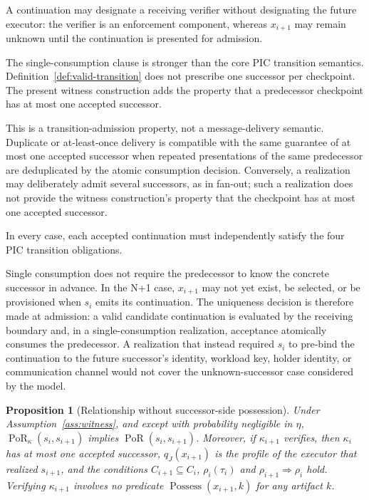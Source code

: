 \documentclass[10pt,twocolumn]{article}
\newcommand{\PoR}{\operatorname{PoR}}
\newtheorem{proposition}{Proposition}
\begin{document}
A continuation may designate a receiving verifier without designating the
future executor: the verifier is an enforcement component, whereas
\(x_{i+1}\) may remain unknown until the continuation is presented for
admission.

The single-consumption clause is stronger than the core PIC transition
semantics. Definition~\ref{def:valid-transition} does not prescribe one
successor per checkpoint. The present witness construction adds the property
that a predecessor checkpoint has at most one accepted successor.

This is a transition-admission property, not a message-delivery semantic.
Duplicate or at-least-once delivery is compatible with the same
guarantee of at most one accepted successor when repeated presentations of the
same predecessor are deduplicated by the atomic consumption decision.
Conversely, a realization may deliberately admit several successors, as in
fan-out; such a
realization does not provide the witness construction's property that the
checkpoint has at most one accepted successor.

In every case, each accepted continuation must independently satisfy the four
PIC transition obligations.

Single consumption does not require the predecessor to know the concrete
successor in advance. In the N+1 case, \(x_{i+1}\) may not yet exist, be
selected, or be provisioned when \(s_i\) emits its continuation. The uniqueness
decision is therefore made at admission: a valid candidate continuation is
evaluated by the receiving boundary and, in a single-consumption realization,
acceptance atomically consumes the predecessor. A realization that instead
required \(s_i\) to pre-bind the continuation to the future successor's
identity, workload key, holder identity, or communication channel would not
cover the unknown-successor case considered by the model.

\begin{proposition}[Relationship without successor-side possession]
\label{prop:witness}
Under Assumption~\ref{ass:witness}, and except with probability negligible in
\(\eta\), \(\PoR_\kappa(s_i,s_{i+1})\) implies
\(\PoR(s_i,s_{i+1})\). Moreover, if \(\kappa_{i+1}\) verifies, then \(\kappa_i\)
has at most one accepted successor, \(q_J(x_{i+1})\) is the profile of the
executor that realized \(s_{i+1}\), and the conditions \(C_{i+1}\subseteq C_i\),
\(\rho_i(\tau_i)\) and \(\rho_{i+1}\Rightarrow\rho_i\) hold. Verifying
\(\kappa_{i+1}\) involves no predicate \(\operatorname{Possess}(x_{i+1},k)\) for
any artifact \(k\).
\end{proposition}
\end{document}
